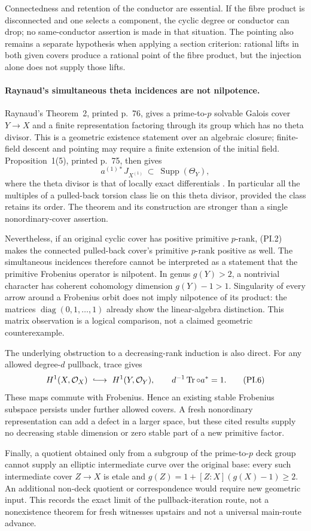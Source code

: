Connectedness and retention of the conductor are essential.
If the fibre product is disconnected and one selects a
component, the cyclic degree or conductor can drop; no
same-conductor assertion is made in that situation.
The pointing also remains a separate hypothesis when applying
a section criterion: rational lifts in both given covers
produce a rational point of the fibre product, but the
injection alone does not supply those lifts.

\paragraph{Raynaud's simultaneous theta incidences are not nilpotence.}
Raynaud's Theorem~2, printed p.~76, gives a prime-to-$p$
solvable Galois cover $Y\to X$ and a finite representation
factoring through its group which has no theta divisor.
This is a geometric existence statement over an algebraic
closure; finite-field descent and pointing may require a
finite extension of the initial field.
Proposition~1(5), printed p.~75, then gives
\[
 a^{(1)*}J_{X^{(1)}}\ \subset\ \operatorname{Supp}(\Theta_Y),
 \tag{PI.5}
\]
where the theta divisor is that of locally exact differentials
\cite[Proposition~1(5), Theorem~2]{RaynaudNonordinary2000}.
In particular all the multiples of a pulled-back torsion class
lie on this theta divisor, provided the class retains its order.
The theorem and its construction are stronger than a single
nonordinary-cover assertion.

Nevertheless, if an original cyclic cover has positive
primitive $p$-rank, (PI.2) makes the connected pulled-back
cover's primitive $p$-rank positive as well. The simultaneous
incidences therefore cannot be interpreted as a statement that
the primitive Frobenius operator is nilpotent. In genus
$g(Y)>2$, a nontrivial character has coherent cohomology
dimension $g(Y)-1>1$. Singularity of every arrow around a
Frobenius orbit does not imply nilpotence of its product:
the matrices $\operatorname{diag}(0,1,\ldots,1)$ already show
the linear-algebra distinction. This matrix observation is a
logical comparison, not a claimed geometric counterexample.

The underlying obstruction to a decreasing-rank induction is
also direct. For any allowed degree-$d$ pullback, trace gives
\[
 H^1(X,\mathcal O_X)\ \lhook\joinrel\longrightarrow\
 H^1(Y,\mathcal O_Y),\qquad
                 d^{-1}\operatorname{Tr}\circ a^*=1.
 \tag{PI.6}
\]
These maps commute with Frobenius. Hence an existing stable
Frobenius subspace persists under further allowed covers.
A fresh nonordinary representation can add a defect in a
larger space, but these cited results supply no decreasing
stable dimension or zero stable part of a new primitive factor.

Finally, a quotient obtained only from a subgroup of the
prime-to-$p$ deck group cannot supply an elliptic intermediate
curve over the original base: every such intermediate cover
$Z\to X$ is etale and
$g(Z)=1+[Z:X](g(X)-1)\ge2$.
An additional non-deck quotient or correspondence would require
new geometric input. This records the exact limit of the
pullback-iteration route, not a nonexistence theorem for fresh
witnesses upstairs and not a universal main-route advance.
